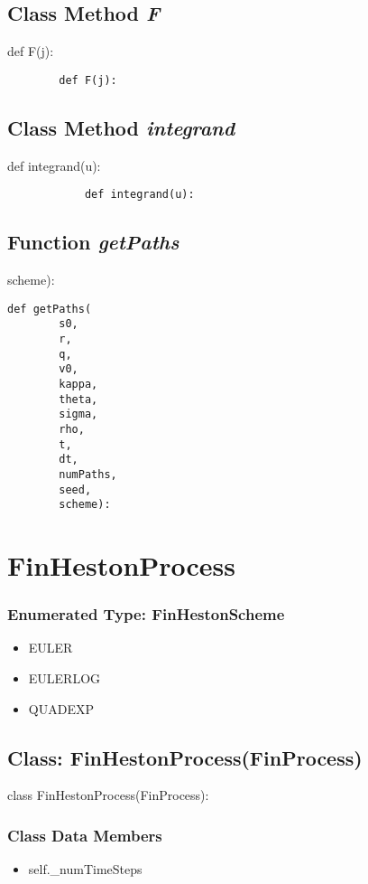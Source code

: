 \documentclass[twoside,11pt]{book}
\begin{document}
\subsection{Class Method {\it F}}
def F(j):

\begin{lstlisting}
        def F(j):
\end{lstlisting}

\subsection{Class Method {\it integrand}}
def integrand(u):

\begin{lstlisting}
            def integrand(u):
\end{lstlisting}

\subsection{Function {\it getPaths}}
scheme):

\begin{lstlisting}
def getPaths(
        s0,
        r,
        q,
        v0,
        kappa,
        theta,
        sigma,
        rho,
        t,
        dt,
        numPaths,
        seed,
        scheme):
\end{lstlisting}

\newpage
\section{FinHestonProcess}

\subsubsection{Enumerated Type: FinHestonScheme}
\begin{itemize}
\item{EULER}
\item{EULERLOG}
\item{QUADEXP}
\end{itemize}

\subsection{Class: FinHestonProcess(FinProcess)}
class FinHestonProcess(FinProcess):

\subsubsection{Class Data Members}
\begin{itemize}
\item{self.\_numTimeSteps}
\end{itemize}
\end{document}
